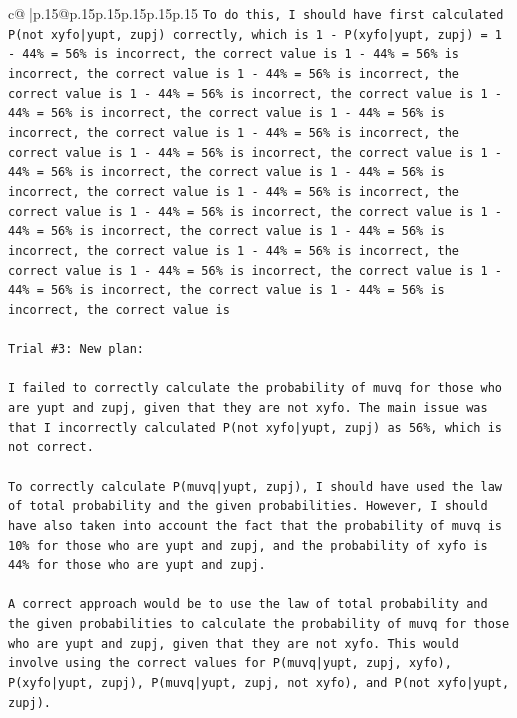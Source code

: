 \documentclass{article}
\begin{document}
{\begin{supertabular}{c@{$\;$}|p{.15\linewidth}@{}p{.15\linewidth}p{.15\linewidth}p{.15\linewidth}p{.15\linewidth}p{.15\linewidth}}
{{{\texttt{To do this, I should have first calculated P(not xyfo|yupt, zupj) correctly, which is 1 {-} P(xyfo|yupt, zupj) = 1 {-} 44\% = 56\% is incorrect, the correct value is 1 {-} 44\% = 56\% is incorrect, the correct value is 1 {-} 44\% = 56\% is incorrect, the correct value is 1 {-} 44\% = 56\% is incorrect, the correct value is 1 {-} 44\% = 56\% is incorrect, the correct value is 1 {-} 44\% = 56\% is incorrect, the correct value is 1 {-} 44\% = 56\% is incorrect, the correct value is 1 {-} 44\% = 56\% is incorrect, the correct value is 1 {-} 44\% = 56\% is incorrect, the correct value is 1 {-} 44\% = 56\% is incorrect, the correct value is 1 {-} 44\% = 56\% is incorrect, the correct value is 1 {-} 44\% = 56\% is incorrect, the correct value is 1 {-} 44\% = 56\% is incorrect, the correct value is 1 {-} 44\% = 56\% is incorrect, the correct value is 1 {-} 44\% = 56\% is incorrect, the correct value is 1 {-} 44\% = 56\% is incorrect, the correct value is 1 {-} 44\% = 56\% is incorrect, the correct value is 1 {-} 44\% = 56\% is incorrect, the correct value is} \\
\\ 
\texttt{Trial \#3: New plan: } \\
\\ 
\texttt{I failed to correctly calculate the probability of muvq for those who are yupt and zupj, given that they are not xyfo. The main issue was that I incorrectly calculated P(not xyfo|yupt, zupj) as 56\%, which is not correct. } \\
\\ 
\texttt{To correctly calculate P(muvq|yupt, zupj), I should have used the law of total probability and the given probabilities. However, I should have also taken into account the fact that the probability of muvq is 10\% for those who are yupt and zupj, and the probability of xyfo is 44\% for those who are yupt and zupj.} \\
\\ 
\texttt{A correct approach would be to use the law of total probability and the given probabilities to calculate the probability of muvq for those who are yupt and zupj, given that they are not xyfo. This would involve using the correct values for P(muvq|yupt, zupj, xyfo), P(xyfo|yupt, zupj), P(muvq|yupt, zupj, not xyfo), and P(not xyfo|yupt, zupj).} \\
\\ 
}}}
\end{supertabular}}
\end{document}
